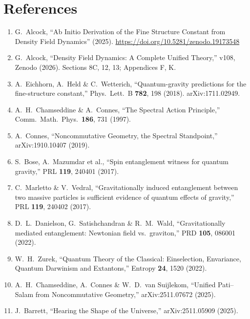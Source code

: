 \documentclass[12pt,a4paper]{article}
\begin{document}
\section*{References}

\begin{enumerate}
\item[{[1]}] G.~Alcock, ``Ab Initio Derivation of the Fine Structure Constant from Density Field Dynamics'' (2025). \url{https://doi.org/10.5281/zenodo.19173548}

\item[{[2]}] G.~Alcock, ``Density Field Dynamics: A Complete Unified Theory,'' v108, Zenodo (2026). Sections 8C, 12, 13; Appendices F, K.

\item[{[3]}] A.~Eichhorn, A.~Held \& C.~Wetterich, ``Quantum-gravity predictions for the fine-structure constant,'' Phys.\ Lett.\ B \textbf{782}, 198 (2018). arXiv:1711.02949.

\item[{[4]}] A.~H.~Chamseddine \& A.~Connes, ``The Spectral Action Principle,'' Comm.\ Math.\ Phys.\ \textbf{186}, 731 (1997).

\item[{[5]}] A.~Connes, ``Noncommutative Geometry, the Spectral Standpoint,'' arXiv:1910.10407 (2019).

\item[{[6]}] S.~Bose, A.~Mazumdar et al., ``Spin entanglement witness for quantum gravity,'' PRL \textbf{119}, 240401 (2017).

\item[{[7]}] C.~Marletto \& V.~Vedral, ``Gravitationally induced entanglement between two massive particles is sufficient evidence of quantum effects of gravity,'' PRL \textbf{119}, 240402 (2017).

\item[{[8]}] D.~L.~Danielson, G.~Satishchandran \& R.~M.~Wald, ``Gravitationally mediated entanglement: Newtonian field vs.\ graviton,'' PRD \textbf{105}, 086001 (2022).

\item[{[9]}] W.~H.~Zurek, ``Quantum Theory of the Classical: Einselection, Envariance, Quantum Darwinism and Extantons,'' Entropy \textbf{24}, 1520 (2022).

\item[{[10]}] A.~H.~Chamseddine, A.~Connes \& W.~D.~van Suijlekom, ``Unified Pati--Salam from Noncommutative Geometry,'' arXiv:2511.07672 (2025).

\item[{[11]}] J.~Barrett, ``Hearing the Shape of the Universe,'' arXiv:2511.05909 (2025).
\end{enumerate}
\end{document}

